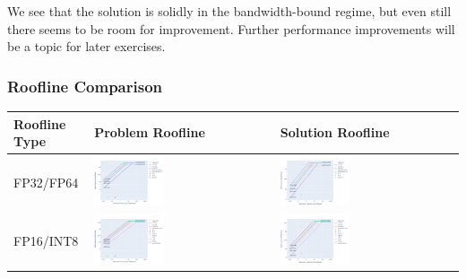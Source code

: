 \documentclass[
]{article}
\begin{document}
We see that the solution is solidly in the bandwidth-bound regime, but
even still there seems to be room for improvement. Further performance
improvements will be a topic for later exercises.

\hypertarget{roofline-comparison}{%
\subsubsection{Roofline Comparison}\label{roofline-comparison}}

\begin{longtable}[]{@{}lll@{}}
\toprule
Roofline Type & Problem Roofline & Solution Roofline\tabularnewline
\midrule
\endhead
FP32/FP64 &
\includegraphics[width=0.4\textwidth,height=0.4\textheight]{omniperf/launch_parameters/1c1e7ac9bcf47ad1d9ab16625d90a45bcc6dc51f.png} &
\includegraphics[width=0.4\textwidth,height=0.4\textheight]{omniperf/launch_parameters/ff410f6f69cbebe8bb4a9c8661ed8e6dcb35e6bc.png}\tabularnewline
FP16/INT8 &
\includegraphics[width=0.4\textwidth,height=0.4\textheight]{omniperf/launch_parameters/aeb466a8cd337877bd21ecfe9b9a109f5a42050b.png} &
\includegraphics[width=0.4\textwidth,height=0.4\textheight]{omniperf/launch_parameters/a31cee3a36401e534a18b717c66f33144d89c7e5.png}\tabularnewline
\bottomrule
\end{longtable}
\end{document}
